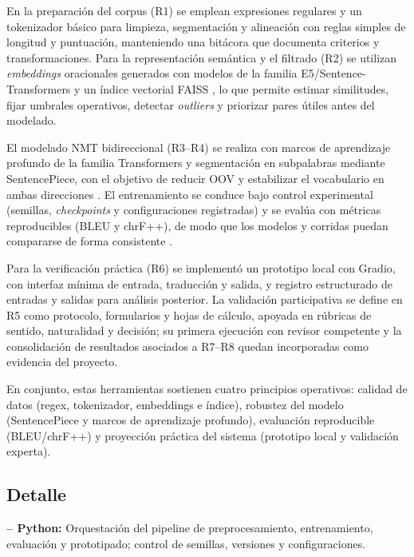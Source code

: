 \documentclass[12pt,a4paper,oneside]{book}
\begin{document}
En la preparación del corpus (R1) se emplean expresiones regulares y un tokenizador básico para limpieza, segmentación y alineación con reglas simples de longitud y puntuación, manteniendo una bitácora que documenta criterios y transformaciones. Para la representación semántica y el filtrado (R2) se utilizan \emph{embeddings} oracionales generados con modelos de la familia E5/Sentence-Transformers \parencite{reimers2019sbert,wang2022e5} y un índice vectorial FAISS \parencite{johnson2019faiss}, lo que permite estimar similitudes, fijar umbrales operativos, detectar \emph{outliers} y priorizar pares útiles antes del modelado.

El modelado NMT bidireccional (R3--R4) se realiza con marcos de aprendizaje profundo de la familia Transformers y segmentación en subpalabras mediante SentencePiece, con el objetivo de reducir OOV y estabilizar el vocabulario en ambas direcciones \parencite{kudo2018sentencepiece}. El entrenamiento se conduce bajo control experimental (semillas, \emph{checkpoints} y configuraciones registradas) y se evalúa con métricas reproducibles (BLEU y chrF++), de modo que los modelos y corridas puedan compararse de forma consistente \parencite{papineni2002bleu,popovic2015chrf}.

Para la verificación práctica (R6) se implementó un prototipo local con Gradio, con interfaz mínima de entrada, traducción y salida, y registro estructurado de entradas y salidas para análisis posterior. La validación participativa se define en R5 como protocolo, formularios y hojas de cálculo, apoyada en rúbricas de sentido, naturalidad y decisión; su primera ejecución con revisor competente y la consolidación de resultados asociados a R7--R8 quedan incorporadas como evidencia del proyecto.

En conjunto, estas herramientas sostienen cuatro principios operativos: calidad de datos (regex, tokenizador, embeddings e índice), robustez del modelo (SentencePiece y marcos de aprendizaje profundo), evaluación reproducible (BLEU/chrF++) y proyección práctica del sistema (prototipo local y validación experta).

\subsection{Detalle}\label{detalle}

\textbf{-- Python:} Orquestación del pipeline de preprocesamiento, entrenamiento, evaluación y prototipado; control de semillas, versiones y configuraciones.
\end{document}
